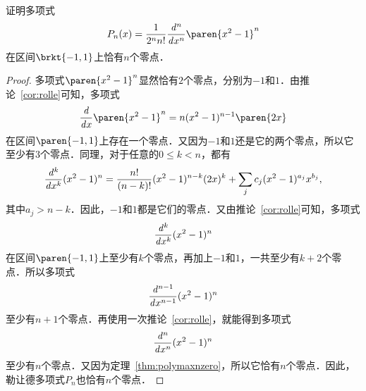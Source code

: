 \begin{example*}[勒让德多项式]
  证明多项式
  \begin{equation*}
    P_n(x) = \frac1{2^nn!} \ddn xn \paren{x^2-1}^n
  \end{equation*}
  在区间\(\brkt{-1,1}\)上恰有\(n\)个零点．

  \begin{proof}
    多项式\(\paren{x^2-1}^n\)显然恰有\(2\)个零点，分别为\(-1\)和\(1\)．由推论~\ref{cor:rolle}可知，多项式
    \begin{equation*}
      \ddx \paren{x^2-1}^n = n(x^2-1)^{n-1} \paren{2x}
    \end{equation*}
    在区间\(\paren{-1,1}\)上存在一个零点．又因为\(-1\)和\(1\)还是它的两个零点，所以它至少有\(3\)个零点．同理，对于任意的\(0 \le k < n\)，都有
    \begin{equation*}
      \frac{\mathop{}\!\mathit{d}^{k}}{\mathop{}\!\mathit{d} x^{k}} (x^2-1)^n = \frac{n!}{(n-k)!}(x^2-1)^{n-k} (2x)^k + \sum_j c_j (x^2-1)^{a_j} x^{b_j},
    \end{equation*}
    其中\(a_j > n-k\)．因此，\(-1\)和\(1\)都是它们的零点．又由推论~\ref{cor:rolle}可知，多项式
    \begin{equation*}
      \frac{\mathop{}\!\mathit{d}^{k}}{\mathop{}\!\mathit{d} x^{k}} (x^2-1)^n
    \end{equation*}
    在区间\(\paren{-1,1}\)上至少有\(k\)个零点，再加上\(-1\)和\(1\)，一共至少有\(k+2\)个零点．所以多项式
    \begin{equation*}
      \frac{\mathop{}\!\mathit{d}^{n-1}}{\mathop{}\!\mathit{d} x^{n-1}} (x^2-1)^n
    \end{equation*}
    至少有\(n+1\)个零点．再使用一次推论~\ref{cor:rolle}，就能得到多项式
    \begin{equation*}
      \frac{\mathop{}\!\mathit{d}^{n}}{\mathop{}\!\mathit{d} x^{n}} (x^2-1)^n
    \end{equation*}
    至少有\(n\)个零点．又因为定理~\ref{thm:polymaxnzero}，所以它恰有\(n\)个零点．因此，勒让德多项式\(P_n\)也恰有\(n\)个零点．
  \end{proof}
\end{example*}


